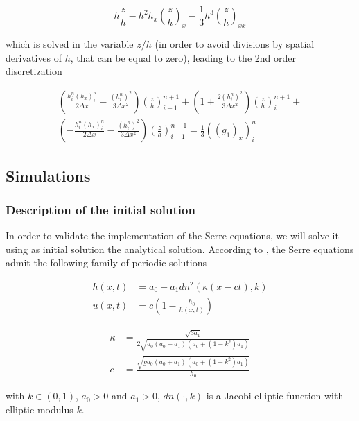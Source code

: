 \begin{equation}
h\frac{z}{h} - h^2h_x \left( \frac{z}{h} \right)_x - \frac{1}{3}h^3\left( \frac{z}{h}\right)_{xx}
\end{equation}

\noindent which is solved in the variable $z/h$ (in order to avoid divisions by spatial derivatives of $h$, that can be equal to zero), leading to the 2nd order discretization

\begin{equation}
\begin{split}
\left( \frac{h_i^n(h_x)_i^n}{2\Delta x} - \frac{(h_i^n)^2}{3\Delta x^2} \right)  \left( \frac{z}{h} \right)_{i-1}^{n+1} + 
 \left( 1 + \frac{2(h_i^n)^2}{3\Delta x^2} \right)\left( \frac{z}{h} \right)_{i}^{n+1} + \\
  \left( -\frac{h_i^n(h_x)_i^n}{2\Delta x} - \frac{(h_i^n)^2}{3\Delta x^2} \right)\left( \frac{z}{h} \right)_{i+1}^{n+1} = \frac{1}{3} \left(\left( g_1 \right)_x\right)_i^n
  \end{split}
\end{equation}

\subsection{Simulations}

\subsubsection{Description of the initial solution}

\indent In order to validate the implementation of the Serre equations, we will solve it using as initial solution the analytical solution. According to \cite{CarterCienfuegos2011}, the Serre equations admit the following family of periodic solutions

\begin{align*}
    h(x,t) &= a_0 + a_1 dn^2(\kappa(x-ct),k) \\
    u(x,t) &= c\left( 1 - \frac{h_0}{h(x,t)}\right)
\end{align*}

\begin{align*}
    \kappa &= \frac{\sqrt{3a_1}}{2\sqrt{a_0(a_0+a_1)(a_0+(1-k^2)a_1)}} \\
    c &= \frac{\sqrt{g a_0(a_0+a_1)(a_0+(1-k^2)a_1)}}{h_0}
\end{align*}

\noindent with $k\in(0,1)$, $a_0>0$ and $a_1>0$, $dn(\cdot,k)$ is a Jacobi elliptic function with elliptic modulus $k$.

